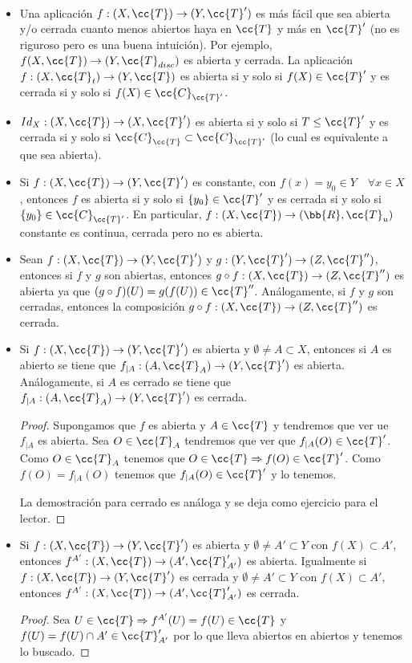 \begin{ejemplo}\
    \begin{itemize}
        \item Una aplicación $f: (X, \cc{T}) \to (Y, \cc{T}')$ es más fácil que sea abierta y/o cerrada cuanto menos abiertos haya en $\cc{T}$ y más en $\cc{T}'$ (no es riguroso pero es una buena intuición). Por ejemplo, $f(X, \cc{T})\to (Y, \cc{T}_{disc})$ es abierta y cerrada.
        La aplicación $f:(X, \cc{T}_t) \to (Y, \cc{T})$ es abierta si y solo si $f(X)\in \cc{T}'$ y es cerrada si y solo si $f(X)\in \cc{C}_{\cc{T}'}$.
        \item $Id_X :  (X, \cc{T})\to (X, \cc{T}')$ es abierta si y solo si $T \leq \cc{T}'$ y es cerrada si y solo si $\cc{C}_{\cc{T}}\subset \cc{C}_{\cc{T}'}$ (lo cual es equivalente a que sea abierta).
        \item Si $f:(X, \cc{T})\to (Y, \cc{T}')$ es constante, con $f(x)=y_0\in Y$\ \ $\forall x \in X$, entonces $f$ es abierta si y solo si $\{y_0\}\in \cc{T}'$ y es cerrada si y solo si $\{y_0\}\in \cc{C}_{\cc{T}'}$. En particular, $f:(X, \cc{T})\to (\bb{R}, \cc{T}_u)$ constante es continua, cerrada pero no es abierta.
        \item Sean $f:(X, \cc{T})\to (Y,\cc{T}')$ y $g:(Y,\cc{T}')\to (Z, \cc{T}'')$, entonces si $f $ y $ g$ son abiertas, entonces $g\circ f:(X, \cc{T})\to (Z, \cc{T}'')$ es abierta ya que $(g\circ f)(U)=g(f(U))\in \cc{T}''$. Análogamente, si $f$ y $g$ son cerradas, entonces la composición $g\circ f:(X, \cc{T})\to (Z, \cc{T}'')$ es cerrada.
        \item Si $f:(X, \cc{T})\to (Y, \cc{T}')$ es abierta y $\emptyset \neq A \subset X$, entonces si $A$ es abierto se tiene que $f_{|A}:(A, \cc{T}_A)\to (Y, \cc{T}')$ es abierta. Análogamente, si $A$ es cerrado se tiene que $f_{|A}:(A, \cc{T}_A)\to (Y, \cc{T}')$ es cerrada.
        \begin{proof}
            Supongamos que $f$ es abierta y $A\in \cc{T}$ y tendremos que ver ue $f_{|A}$ es abierta. Sea $O\in \cc{T}_A$ tendremos que ver que $f_{|A}(O)\in \cc{T}'$. Como $O\in \cc{T}_A$ tenemos que $O\in \cc{T} \Rightarrow f(O)\in \cc{T}'$. Como $f(O)=f_{|A}(O)$ tenemos que $f_{|A}(O)\in \cc{T}'$ y lo tenemos. 

            La demostración para cerrado es análoga y se deja como ejercicio para el lector.
        \end{proof}

        \item Si $f:(X, \cc{T})\to (Y, \cc{T}')$ es abierta y $\emptyset \neq A' \subset Y $ con $f(X)\subset A'$, entonces $f^{A'}:(X, \cc{T})\to (A', \cc{T}_{A'}')$ es abierta. Igualmente si $f:(X, \cc{T})\to (Y, \cc{T}')$ es cerrada y $\emptyset \neq A' \subset Y $ con $f(X)\subset A'$, entonces $f^{A'}:(X, \cc{T})\to (A', \cc{T}_{A'}')$ es cerrada.
        \begin{proof}
            Sea $U\in \cc{T} \Rightarrow f^{A'}(U)=f(U)\in \cc{T}$ y $f(U)=f(U)\cap A'\in \cc{T}_{A'}'$ por lo que lleva abiertos en abiertos y tenemos lo buscado.


\end{proof}
\end{itemize}
\end{ejemplo}
